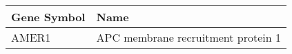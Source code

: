 \begin{tabular}{ll}
\toprule
Gene Symbol &                               Name \\
\midrule
      AMER1 & APC membrane recruitment protein 1 \\
\bottomrule
\end{tabular}
